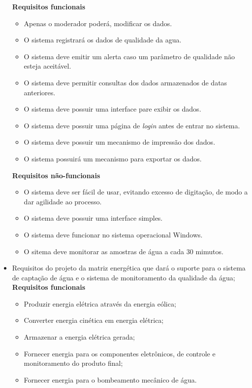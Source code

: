 \begin{itemize}
	 \textbf{Requisitos funcionais}
	  \begin{itemize}
	   \item Apenas o moderador poderá, modificar os dados.
	   \item O sistema registrará os dados de qualidade da agua.
	   \item O sistema deve emitir um alerta caso um parâmetro de qualidade não esteja aceitável.
	   \item O sistema deve permitir consultas dos dados armazenados de datas anteriores.
	   \item O sistema deve possuir uma interface pare exibir os dados.
	   \item O sistema deve possuir uma página de \textit{login} antes de entrar no sistema.
	   \item O sistema deve possuir um mecanismo de impressão dos dados.
	   \item O sistema possuirá um mecanismo para exportar os dados.
	  \end{itemize}
	  
	  \textbf{Requisitos não-funcionais}
	  \begin{itemize}
	   \item O sistema deve ser fácil de usar, evitando excesso de digitação, de modo a dar agilidade ao processo.
	   \item O sistema deve possuir uma interface simples.
	   \item O sistema deve funcionar no sistema operacional Windows.
	   \item O sitema deve monitorar as amostras de água a cada 30 mimutos.
	  \end{itemize}
      
      \item Requisitos do projeto da matriz energética que dará o suporte para o sistema de captação de água e o sistema de monitoramento da qualidade da água;\\
      
	\textbf{Requisitos funcionais}
	\begin{itemize}
	  \item Produzir energia elétrica através da energia eólica;
	  \item Converter energia cinética em energia elétrica;
	  \item Armazenar a energia elétrica gerada;
	  \item Fornecer energia para os componentes eletrônicos, de controle e monitoramento do produto final;
	  \item Fornecer energia para o bombeamento mecânico de água.
	\end{itemize}
	

\end{itemize}
